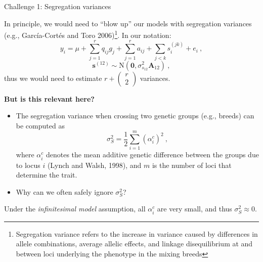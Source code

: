 \documentclass[10pt,ignorenonframetext,]{beamer}
\providecommand{\tightlist}{%
  \setlength{\itemsep}{0pt}\setlength{\parskip}{0pt}}
\begin{document}
\begin{frame}

\begin{block}{Challenge 1: Segregation variances}

\vspace{3mm}

In principle, we would need to ``blow up'' our models with segregation
variances (e.g., García-Cortés and Toro
2006)\footnote{Segregation variance refers to the increase in variance caused by differences in allele combinations, average allelic effects, and linkage disequilibrium at and between loci underlying the phenotype in the mixing breeds}.
In our notation:
\[y_i = \mu + \sum_{j=1}^r q_{ij}g_j + \sum_{j=1}^r a_{ij}  + \sum_{j < k} s^{(jk)}_i +  e_i \ ,\]
\[\mathbf{s}^{(12)}\sim \text{N}(\mathbf{0},\sigma_{s_{12}}^2 \mathbf{A}_{12})  \ ,\]
thus we would need to estimate
\(r + \left( \begin{matrix} r\\ 2 \end{matrix}\right)\) variances.

\vspace{10mm}

\textbf{But is this relevant here?}

\end{block}

\end{frame}

\begin{frame}

\begin{itemize}
\tightlist
\item
  The segregation variance when crossing two genetic groups (e.g.,
  breeds) can be computed as
  \[\sigma_S^2 =\frac{1}{2} \sum_{i=1}^m (\alpha_i^c)^2 \ ,\] where
  \(\alpha_i^c\) denotes the mean additive genetic difference between
  the groups due to locus \(i\) (Lynch and Walsh, 1998), and \(m\) is
  the number of loci that determine the trait.
\end{itemize}

\vspace{3mm}

\begin{itemize}
\tightlist
\item
  Why can we often safely ignore \(\sigma_S^2\)?
\end{itemize}

\pause

\vspace{3mm}

\begin{block}{Under the \emph{infinitesimal model} assumption, all
\(\alpha_i^c\) are very small, and thus \(\sigma_S^2 \approx 0\).}

\end{block}

\end{frame}
\end{document}
